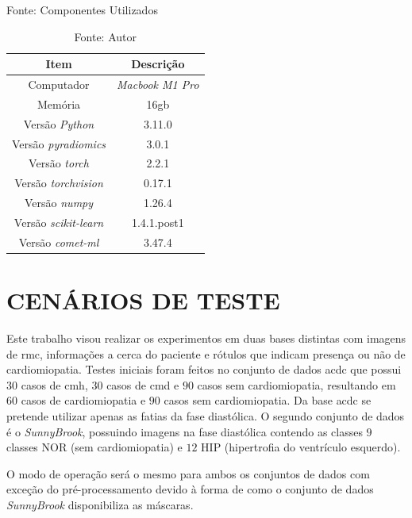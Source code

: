 \begin{table}[hbtp]
    \caption{Fonte: Componentes Utilizados}
    \centering
    \renewcommand{\arraystretch}{1} %
    \begin{tabular}{|c|c|}
    \hline 
       \textbf{Item} & \textbf{Descrição}\\
    \hline 
       Computador & \textit{Macbook M1 Pro}  \\
    \hline 
       Memória & 16gb  \\
    \hline 
       Versão \textit{Python} & 3.11.0  \\
    \hline 
       Versão \textit{pyradiomics} & 3.0.1 \\
    \hline 
       Versão \textit{torch} & 2.2.1 \\
    \hline 
       Versão \textit{torchvision} & 0.17.1 \\
    \hline 
       Versão \textit{numpy} & 1.26.4 \\
    \hline 
       Versão \textit{scikit-learn} & 1.4.1.post1 \\
    \hline 
       Versão \textit{comet-ml} & 3.47.4 \\
    \hline 
    \end{tabular} 
    \caption*{Fonte: Autor}
    \label{tab:hardware_software}
\end{table}

\section{CENÁRIOS DE TESTE} 
\label{subsec:cap5_dataset}

Este trabalho visou realizar os experimentos em duas bases distintas com imagens de \gls{rmc}, informações a cerca do paciente e rótulos que indicam presença ou não de cardiomiopatia. Testes iniciais foram feitos no conjunto de dados \gls{acdc} que possui $30$ casos de \gls{cmh}, $30$ casos de \gls{cmd} e $90$ casos sem cardiomiopatia, resultando em $60$ casos de cardiomiopatia e $90$ casos sem cardiomiopatia. Da base \gls{acdc} se pretende utilizar apenas as fatias da fase diastólica. O segundo conjunto de dados é o \textit{SunnyBrook}, possuindo imagens na fase diastólica contendo as classes $9$ classes NOR (sem cardiomiopatia) e $12$ HIP (hipertrofia do ventrículo esquerdo).

O modo de operação será o mesmo para ambos os conjuntos de dados com exceção do pré-processamento devido à forma de como o conjunto de dados \textit{SunnyBrook} disponibiliza as máscaras.

